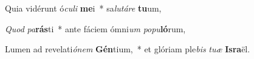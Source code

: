 \item Quia vidérunt ó\textit{cu}\textit{li} \textbf{me}i~* sa\textit{lu}\textit{tá}\textit{re} \textbf{tu}um,
\item \textit{Quod} \textit{pa}\textbf{rás}ti~* ante fáciem ómni\textit{um} \textit{po}\textit{pu}\textbf{ló}rum,
\item Lumen ad revelati\textit{ó}\textit{nem} \textbf{Gén}tium,~* et glóriam ple\textit{bis} \textit{tu}\textit{æ} \textbf{Is}\textbf{ra}ël.
